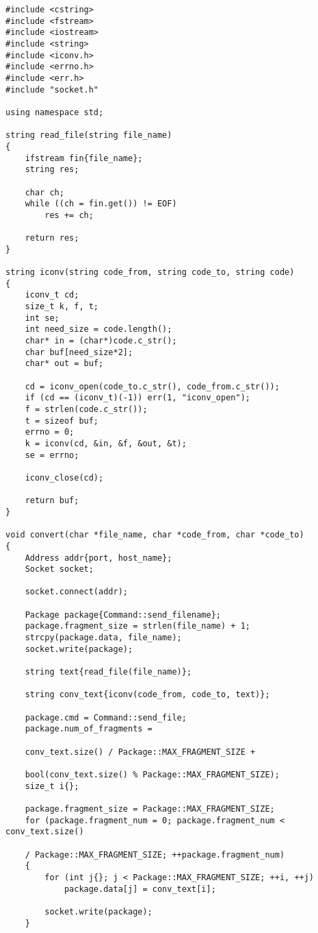 \documentclass[a4paper,12pt]{extarticle}
\begin{document}
\begin{verbatim}
#include <cstring>
#include <fstream>
#include <iostream>
#include <string>
#include <iconv.h>
#include <errno.h>
#include <err.h>
#include "socket.h"

using namespace std;

string read_file(string file_name)
{
    ifstream fin{file_name};
    string res;

    char ch;
    while ((ch = fin.get()) != EOF)
        res += ch;

    return res;
}

string iconv(string code_from, string code_to, string code)
{
    iconv_t cd;
    size_t k, f, t;
    int se;
    int need_size = code.length();
    char* in = (char*)code.c_str();
    char buf[need_size*2];
    char* out = buf;
 
    cd = iconv_open(code_to.c_str(), code_from.c_str());
    if (cd == (iconv_t)(-1)) err(1, "iconv_open");
    f = strlen(code.c_str());
    t = sizeof buf;
    errno = 0;
    k = iconv(cd, &in, &f, &out, &t);
    se = errno;
 
    iconv_close(cd);
 
    return buf;
}

void convert(char *file_name, char *code_from, char *code_to)
{
    Address addr{port, host_name};
    Socket socket;

    socket.connect(addr);

    Package package{Command::send_filename};
    package.fragment_size = strlen(file_name) + 1;
    strcpy(package.data, file_name);
    socket.write(package);

    string text{read_file(file_name)};

    string conv_text{iconv(code_from, code_to, text)};

    package.cmd = Command::send_file;
    package.num_of_fragments = 
    
    conv_text.size() / Package::MAX_FRAGMENT_SIZE +
    
    bool(conv_text.size() % Package::MAX_FRAGMENT_SIZE);
    size_t i{};

    package.fragment_size = Package::MAX_FRAGMENT_SIZE;
    for (package.fragment_num = 0; package.fragment_num < conv_text.size()
    
    / Package::MAX_FRAGMENT_SIZE; ++package.fragment_num)
    {
        for (int j{}; j < Package::MAX_FRAGMENT_SIZE; ++i, ++j)
            package.data[j] = conv_text[i];

        socket.write(package);
    }


\end{verbatim}
\end{document}
